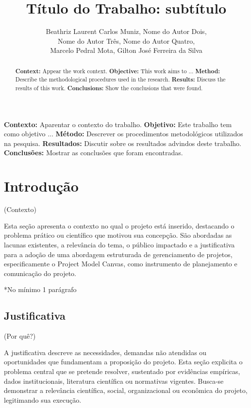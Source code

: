 \documentclass[12pt]{article}
\title{Título do Trabalho: subtítulo}
\author{Beathriz Laurent Carlos Muniz\inst{1}, Nome do Autor Dois\inst{2}, \\Nome do Autor Três\inst{3}, Nome do Autor Quatro\inst{4}, \\Marcelo Pedral Mota\inst{5}, Gilton José Ferreira da Silva\inst{2} }
\begin{document}
 

\maketitle

\begin{abstract}
\textbf {Context:} Appear the work context. \textbf {Objective:} This work aims to ... \textbf {Method:} Describe the methodological procedures used in the research. \textbf {Results:} Discuss the results of this work. \textbf {Conclusions:} Show the conclusions that were found.
\end{abstract}
     
\begin{resumo} 
  \textbf{Contexto:} Aparentar o contexto do trabalho. \textbf{Objetivo:} Este trabalho tem como objetivo ... \textbf{Método:} Descrever os procedimentos metodológicos utilizados na pesquisa. \textbf{Resultados:} Discutir sobre os resultados advindos deste trabalho. \textbf{Conclusões:} Mostrar as conclusões que foram encontradas.
\end{resumo}


\section{Introdução} \label{sec:introducao}
(Contexto)

Esta seção apresenta o contexto no qual o projeto está inserido, destacando o problema prático ou científico que motivou sua concepção. São abordadas as lacunas existentes, a relevância do tema, o público impactado e a justificativa para a adoção de uma abordagem estruturada de gerenciamento de projetos, especificamente o Project Model Canvas, como instrumento de planejamento e comunicação do projeto.

*No mínimo 1 parágrafo


\subsection{Justificativa}
\label{sec:justificativa}
(Por quê?)

A justificativa descreve as necessidades, demandas não atendidas ou oportunidades que fundamentam a proposição do projeto. Esta seção explicita o problema central que se pretende resolver, sustentado por evidências empíricas, dados institucionais, literatura científica ou normativas vigentes. Busca-se demonstrar a relevância científica, social, organizacional ou econômica do projeto, legitimando sua execução.
\end{document}
